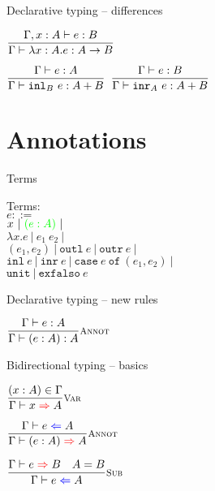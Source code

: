 \documentclass{beamer}
\newcommand{\pipe}{\ |\ }
\newcommand{\Fun}[2]{#1 \to #2}
\newcommand{\Sum}[2]{#1 + #2}
\newcommand{\annot}[2]{(#1 : #2)}
\newcommand{\fun}[2]{\lambda #1. #2}
\newcommand{\app}[2]{#1\ #2}
\newcommand{\pair}[2]{(#1, #2)}
\newcommand{\outl}[1][]{\texttt{outl}\ #1}
\newcommand{\outr}[1][]{\texttt{outr}\ #1}
\newcommand{\inl}[1][]{\texttt{inl}\ #1}
\newcommand{\inr}[1][]{\texttt{inr}\ #1}
\newcommand{\case}[3]{\texttt{case}\ #1\ \texttt{of}\ (#2, #3)}
\newcommand{\unit}{\texttt{unit}}
\newcommand{\exfalso}[1][]{\texttt{exfalso}\ #1}
\newcommand{\fulltyping}[3]{#1 \vdash #2 : #3}
\newcommand{\typing}[2]{\fulltyping{\Gamma}{#1}{#2}}
\newcommand{\infrule}[3][]{\displaystyle \frac{#2}{#3} \textsc{\footnotesize{#1}}}
\newcommand{\extend}[3]{#1, #2 : #3}
\newcommand{\sidecond}[1]{#1}
\begin{document}
\begin{frame}{Declarative typing -- differences}

\begin{center}
  $\infrule{\fulltyping{\extend{\Gamma}{x}{A}}{e}{B}}{\typing{\ifun{x}{A}{e}}{\Fun{A}{B}}}$

  \vspace{2em}

  $\infrule{\typing{e}{A}}{\typing{\iinl{B}{e}}{\Sum{A}{B}}}$ \quad
  $\infrule{\typing{e}{B}}{\typing{\iinr{A}{e}}{\Sum{A}{B}}}$
\end{center}

\end{frame}

\section{Annotations}

\newcommand{\newterm}[1]{\mathcolor{green}{#1}}

\begin{frame}{Terms}

Terms: \\
$e ::=$ \\
\qquad $x \pipe \newterm{\annot{e}{A}} \pipe$ \\
\qquad $\fun{x}{e} \pipe \app{e_1}{e_2} \pipe$ \\
\qquad $\pair{e_1}{e_2} \pipe \outl[e] \pipe \outr[e] \pipe$ \\
\qquad $\inl[e] \pipe \inr[e] \pipe \case{e}{e_1}{e_2} \pipe$ \\
\qquad $\unit \pipe \exfalso{e}$
  
\end{frame}

\begin{frame}{Declarative typing -- new rules}

\begin{center}
  $\infrule[Annot]{\typing{e}{A}}{\typing{\annot{e}{A}}{A}}$
\end{center}

\end{frame}

\newcommand{\fullcheck}[3]{#1 \vdash #2 \mathcolor{blue}{\Leftarrow} #3}
\renewcommand{\check}[2]{\fullcheck{\Gamma}{#1}{#2}}

\newcommand{\fullinfer}[3]{#1 \vdash #2 \mathcolor{red}{\Rightarrow} #3}
\newcommand{\infer}[2]{\fullinfer{\Gamma}{#1}{#2}}

\begin{frame}{Bidirectional typing -- basics}

\begin{center}
  $\infrule[Var]{\sidecond{(x : A) \in \Gamma}}{\infer{x}{A}}$

  \vspace{2em}

  $\infrule[Annot]{\check{e}{A}}{\infer{\annot{e}{A}}{A}}$

  \vspace{2em}

  $\infrule[Sub]{\infer{e}{B} \quad \sidecond{A = B}}{\check{e}{A}}$
\end{center}

\end{frame}
\end{document}
